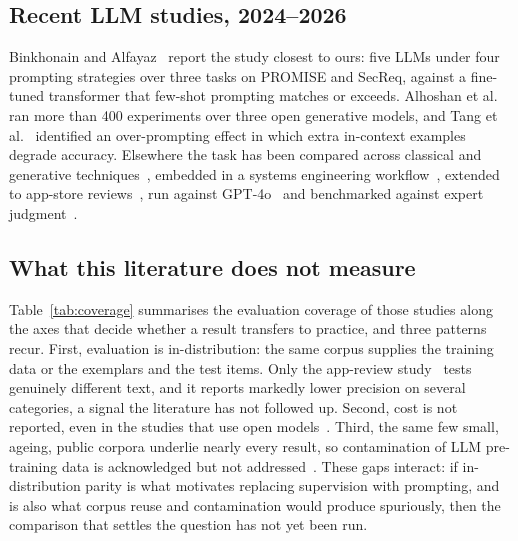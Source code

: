 \documentclass[conference]{IEEEtran}
\begin{document}
\subsection{Recent LLM studies, 2024--2026}
Binkhonain and Alfayaz~\cite{binkhonain2025} report the study closest to ours:
five LLMs under four prompting strategies over three tasks on PROMISE and
SecReq, against a fine-tuned transformer that few-shot prompting matches or
exceeds. Alhoshan et al.~\cite{alhoshan2025} ran more than 400 experiments over
three open generative models, and Tang et al.~\cite{tang2025} identified an
over-prompting effect in which extra in-context examples degrade accuracy.
Elsewhere the task has been compared across classical and generative
techniques~\cite{elhajjami2024}, embedded in a systems engineering
workflow~\cite{peer2024}, extended to app-store reviews~\cite{chaudhary2025},
run against GPT-4o~\cite{vasudevan2026} and benchmarked against expert
judgment~\cite{levy2026}.

\subsection{What this literature does not measure}
Table~\ref{tab:coverage} summarises the evaluation coverage of those studies
along the axes that decide whether a result transfers to practice, and three
patterns recur. First, evaluation is in-distribution: the same corpus supplies
the training data or the exemplars and the test items. Only the app-review
study~\cite{chaudhary2025} tests genuinely different text, and it reports
markedly lower precision on several categories, a signal the literature has not
followed up. Second, cost is not reported, even in the studies that use open
models~\cite{alhoshan2025,tang2025}. Third, the same few small, ageing, public
corpora underlie nearly every result, so contamination of LLM pre-training data
is acknowledged but not addressed~\cite{sainz2023}. These gaps interact: if
in-distribution parity is what motivates replacing supervision with prompting,
and is also what corpus reuse and contamination would produce spuriously, then
the comparison that settles the question has not yet been run.
\end{document}
